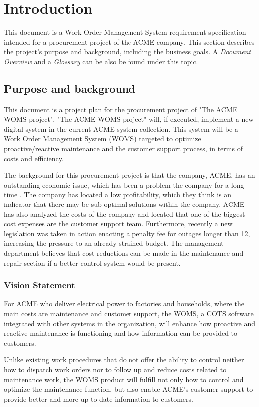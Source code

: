 \section{Introduction}
\label{sec:introduction}
This document is a Work Order Management System requirement specification intended for a procurement project of the ACME company. This section describes the project's purpose and background, including the business goals. A \emph{Document Overview} and a \emph{Glossary} can be also be found under this topic.
\subsection{Purpose and background}
\label{purpose_and_background}
This document is a project plan for the procurement project of "The ACME WOMS project". "The ACME WOMS project" will, if executed, implement a new digital system in the current ACME system collection. This system will be a Work Order Management System (WOMS) targeted to optimize proactive/reactive maintenance and the customer support process, in terms of costs and efficiency.

The background for this procurement project is that the company, ACME, has an outstanding economic issue, which has been a problem the company for a long time \cite{A}. The company has located a low profitability, which they think is an indicator that there may be sub-optimal solutions within the company. ACME has also analyzed the costs of the company and located that one of the biggest cost expenses are the customer support team. Furthermore, recently a new legislation was taken in action enacting a penalty fee for outages longer than 12, increasing the pressure to an already strained budget. The management department believes that cost reductions can be made in the maintenance and repair section if a better control system would be present.

\subsubsection{Vision Statement}
\label{vision_statement}
For ACME who deliver electrical power to factories and households, where the main costs are maintenance and customer support, the WOMS, a COTS software integrated with other systems in the organization, will enhance how proactive and reactive maintenance is functioning and how information can be provided to customers.

Unlike existing work procedures that do not offer the ability to control neither how to dispatch work orders nor to follow up and reduce costs related to maintenance work, the WOMS product will fulfill not only how to control and optimize the maintenance function, but also enable ACME's customer support to provide better and more up-to-date information to customers. 


